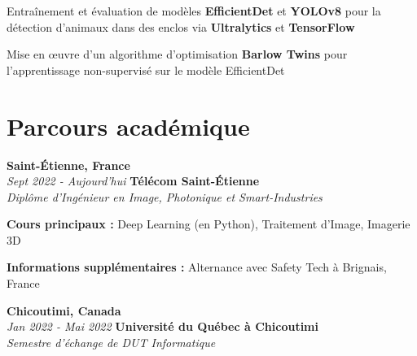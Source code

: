         \begin{onecolentry}
            \begin{highlights}
                \item Entraînement et évaluation de modèles \textbf{EfficientDet} et \textbf{YOLOv8} pour la détection d'animaux dans des enclos via \textbf{Ultralytics} et \textbf{TensorFlow}
                \item Mise en œuvre d'un algorithme d'optimisation \textbf{Barlow Twins} pour l'apprentissage non-supervisé sur le modèle EfficientDet
            \end{highlights}
        \end{onecolentry}

    
    \section{Parcours académique}
        \begin{twocolentry}{
            \textbf{Saint-Étienne, France}\\
            \textit{Sept 2022 - Aujourd'hui}
            }{
            \textbf{Télécom Saint-Étienne}\\
            \textit{Diplôme d'Ingénieur en Image, Photonique et Smart-Industries}
            }
        \end{twocolentry}


        \begin{onecolentry}
            \begin{highlights}
                \item \textbf{Cours principaux :} Deep Learning (en Python), Traitement d'Image, Imagerie 3D
                \item \textbf{Informations supplémentaires :} Alternance avec Safety Tech à Brignais, France
            \end{highlights}
        \end{onecolentry}

		\begin{twocolentry}{
			\textbf{Chicoutimi, Canada} \\
			\textit{Jan 2022 - Mai 2022}
            }{
            \textbf{Université du Québec à Chicoutimi} \\
            \textit{Semestre d'échange de DUT Informatique}
            }
        \end{twocolentry}

